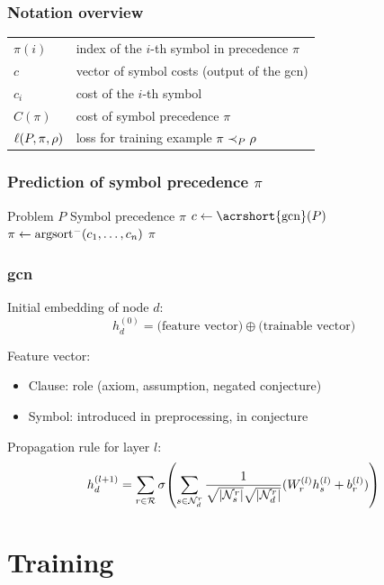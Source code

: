 \documentclass[a4paper]{beamer}
\begin{document}
\begin{frame}
\frametitle{Notation overview}
\begin{center}
\begin{tabular}{ll}
$\pi(i)$ & index of the $i$-th symbol in precedence $\pi$ \\
$c$ & vector of symbol costs (output of the \acrshort{gcn}) \\
$c_i$ & cost of the $i$-th symbol \\
$C(\pi)$ & cost of symbol precedence $\pi$ \\
$\ell(P, \pi, \rho)$ & loss for training example $\pi \prec_{P} \rho$ \\
\end{tabular}
\end{center}
\end{frame}

\begin{frame}
\frametitle{Prediction of symbol precedence $\pi$}
\begin{algorithmic} %
\REQUIRE Problem $P$
\ENSURE Symbol precedence $\pi$
\STATE $c \gets \mathrm{\acrshort{gcn}}(P)$
\STATE $\pi \gets \operatorname{argsort}^- (c_1, \ldots, c_n)$
\RETURN $\pi$
\end{algorithmic}
\end{frame}

\begin{frame}
\frametitle{\Acrfull{gcn}}

Initial embedding of node $d$:
$$
h_d^{(0)} = \textrm{(feature vector)} \oplus \textrm{(trainable vector)}
$$

Feature vector:
\begin{itemize}
\item Clause: role (axiom, assumption, negated conjecture)
\item Symbol: introduced in preprocessing, in conjecture
\end{itemize}

Propagation rule for layer $l$:
$$
h_d^{(l+1)} =
\sum_{r \in \mathcal{R}} \sigma \Parentheses*{\sum_{s \in \mathcal{N}_d^r} \frac{1}{\sqrt{\card{\mathcal{N}_s^r}} \sqrt{\card{\mathcal{N}_d^r}}} (W_r^{(l)} h_s^{(l)} + b_r^{(l)})}
$$

\end{frame}

\section{Training}
\end{document}
